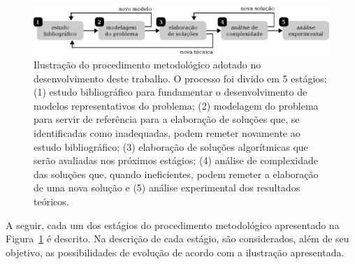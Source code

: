 \begin{figure}[ht]
\centering
\includegraphics[scale=1]{image/metodologia}
\caption[Ilustração do procedimento metodológico]
    {Ilustração do procedimento metodológico adotado no desenvolvimento deste
    trabalho.
    O processo foi divido em 5 estágios:
    (1) estudo bibliográfico para fundamentar o desenvolvimento de modelos
        representativos do problema;
    (2) modelagem do problema para servir de referência para a elaboração de
        soluções que, se identificadas como inadequadas, podem remeter
        novamente ao estudo bibliográfico;
    (3) elaboração de soluções algorítmicas que serão avaliadas nos próximos
        estágios;
    (4) análise de complexidade das soluções que, quando ineficientes, podem
        remeter a elaboração de uma nova solução e
    (5) análise experimental dos resultados teóricos.}
\label{fig:metodologia}
\end{figure}

A seguir, cada um dos estágios do procedimento metodológico apresentado na
Figura~\ref{fig:metodologia} é descrito.
Na descrição de cada estágio, são considerados, além de seu objetivo, as
possibilidades de evolução de acordo com a ilustração apresentada.

